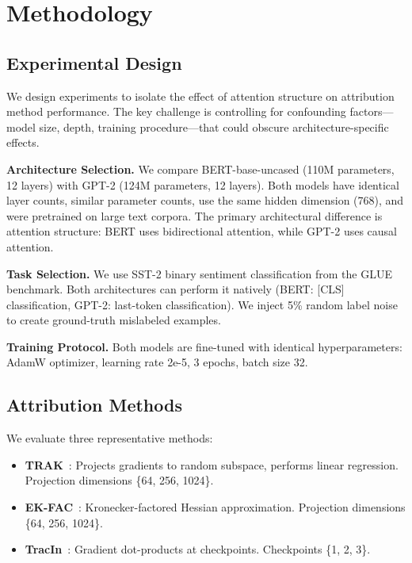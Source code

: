 \section{Methodology}

\subsection{Experimental Design}

We design experiments to isolate the effect of attention structure on attribution method performance. The key challenge is controlling for confounding factors---model size, depth, training procedure---that could obscure architecture-specific effects.

\textbf{Architecture Selection.} We compare BERT-base-uncased (110M parameters, 12 layers) with GPT-2 (124M parameters, 12 layers). Both models have identical layer counts, similar parameter counts, use the same hidden dimension (768), and were pretrained on large text corpora. The primary architectural difference is attention structure: BERT uses bidirectional attention, while GPT-2 uses causal attention.

\textbf{Task Selection.} We use SST-2 binary sentiment classification from the GLUE benchmark. Both architectures can perform it natively (BERT: [CLS] classification, GPT-2: last-token classification). We inject 5\% random label noise to create ground-truth mislabeled examples.

\textbf{Training Protocol.} Both models are fine-tuned with identical hyperparameters: AdamW optimizer, learning rate 2e-5, 3 epochs, batch size 32.

\subsection{Attribution Methods}

We evaluate three representative methods:

\begin{itemize}
    \item \textbf{TRAK}~\cite{park2023trak}: Projects gradients to random subspace, performs linear regression. Projection dimensions \{64, 256, 1024\}.
    \item \textbf{EK-FAC}~\cite{grosse2023studying}: Kronecker-factored Hessian approximation. Projection dimensions \{64, 256, 1024\}.
    \item \textbf{TracIn}~\cite{pruthi2020estimating}: Gradient dot-products at checkpoints. Checkpoints \{1, 2, 3\}.
\end{itemize}

